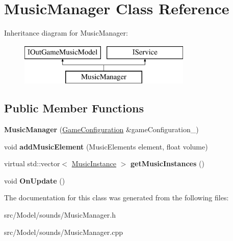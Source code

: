 \hypertarget{classMusicManager}{}\section{Music\+Manager Class Reference}
\label{classMusicManager}
Inheritance diagram for Music\+Manager\+:\begin{figure}[H]
\begin{center}
\leavevmode
\includegraphics[height=2.000000cm]{classMusicManager}
\end{center}
\end{figure}
\subsection*{Public Member Functions}
\begin{DoxyCompactItemize}
\item 
{\bfseries Music\+Manager} (\hyperlink{classGameConfiguration}{Game\+Configuration} \&game\+Configuration\+\_\+)\hypertarget{classMusicManager_ad0024d84fe3f07c7ba5b7e67d7d0a73f}{}\label{classMusicManager_ad0024d84fe3f07c7ba5b7e67d7d0a73f}

\item 
void {\bfseries add\+Music\+Element} (Music\+Elements element, float volume)\hypertarget{classMusicManager_a1e493bda54cbb3f2d76d56aec7885b15}{}\label{classMusicManager_a1e493bda54cbb3f2d76d56aec7885b15}

\item 
virtual std\+::vector$<$ \hyperlink{classMusicInstance}{Music\+Instance} $>$ {\bfseries get\+Music\+Instances} ()\hypertarget{classMusicManager_a7af95198da2bc73f86f4e769c8b663a0}{}\label{classMusicManager_a7af95198da2bc73f86f4e769c8b663a0}

\item 
void {\bfseries On\+Update} ()\hypertarget{classMusicManager_a6b38635e03f4ab27e4491c99bad35228}{}\label{classMusicManager_a6b38635e03f4ab27e4491c99bad35228}

\end{DoxyCompactItemize}


The documentation for this class was generated from the following files\+:\begin{DoxyCompactItemize}
\item 
src/\+Model/sounds/Music\+Manager.\+h\item 
src/\+Model/sounds/Music\+Manager.\+cpp\end{DoxyCompactItemize}
